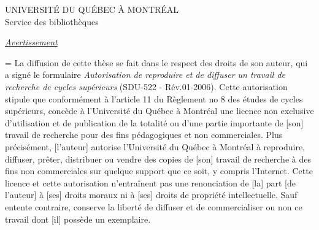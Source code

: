 \thispagestyle{empty}

{\selectfont
{
\begin{center}
UNIVERSITÉ DU QUÉBEC À MONTRÉAL\\
Service des bibliothèques
\end{center}
}
\vspace{3cm}
\begin{center}
\underline{\itshape Avertissement}
\vspace{1.5cm}
\end{center}
{
\emergencystretch=\maxdimen
{}
\noindent La diffusion de cette thèse se fait dans le respect des droits de son auteur, qui a signé le formulaire {\itshape Autorisation de reproduire et de diffuser un travail de recherche de cycles supérieurs} (SDU-522 - Rév.01-2006).
Cette autorisation stipule que \og conformément à l'article 11 du Règlement no 8 des études de cycles supérieurs, \linebreak[4] [l'auteur] concède à l'Université du Québec à Montréal une licence non exclusive d'utilisation et de publication de la totalité ou d'une partie importante de [son] travail de recherche pour des fins pédagogiques et non commerciales. Plus précisément, [l'auteur] autorise l'Université du Québec à Montréal à reproduire, diffuser, prêter, distribuer ou vendre des copies de [son] travail de recherche à des fins non commerciales sur quelque support que ce soit, y compris l'Internet. Cette licence et cette autorisation n'entraînent pas une renonciation de [la] part [de l'auteur] à [ses] droits moraux ni à [ses] droits de propriété intellectuelle. Sauf entente contraire, \linebreak[4] [l'auteur] conserve la liberté de diffuser et de commercialiser ou non ce travail dont [il] possède un exemplaire.\fg\par
}
}
 \restoregeometry
